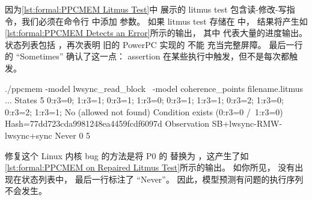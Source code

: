 因为\cref{lst:formal:PPCMEM Litmus Test}中
展示的 litmus test 包含读-修改-写指令，我们必须在命令行
中添加  参数。
如果 litmus test 存储在  中，
结果将产生如\cref{lst:formal:PPCMEM Detects an Error}所示的输出，
其中  代表大量的进度输出。
状态列表包括 ，再次表明
旧的 PowerPC 实现的  不能
充当完整屏障。
最后一行的 ``Sometimes'' 确认了这一点：
assertion 在某些执行中触发，但不是每次都触发。

\begin{listing}
\begin{VerbatimL}[numbers=none,xleftmargin=0pt]
./ppcmem -model lwsync_read_block \
         -model coherence_points filename.litmus
...
States 5
0:r3=0; 1:r3=1;
0:r3=1; 1:r3=0;
0:r3=1; 1:r3=1;
0:r3=2; 1:r3=0;
0:r3=2; 1:r3=1;
No (allowed not found)
Condition exists (0:r3=0 /\ 1:r3=0)
Hash=77dd723cda9981248ea4459fcdf6097d
Observation SB+lwsync-RMW-lwsync+sync Never 0 5
\end{VerbatimL}
\caption{修复后的 Litmus Test 上的 PPCMEM}
\label{lst:formal:PPCMEM on Repaired Litmus Test}
\end{listing}

修复这个 Linux 内核 bug 的方法是将 P0 的  替换为
，这产生了如
\cref{lst:formal:PPCMEM on Repaired Litmus Test}所示的输出。
如你所见， 没有出现在状态列表中，
最后一行标注了 ``Never''。
因此，模型预测有问题的执行序列不会发生。


